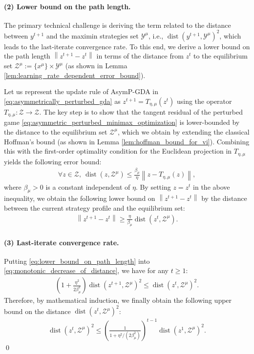 \documentclass{article}
\DeclareMathOperator{\dist}{dist}
\newcommand{\Y}{\mathcal{Y}}
\newcommand{\Z}{\mathcal{Z}}
\theoremstyle{plain}
\begin{document}
\paragraph{(2) Lower bound on the path length.}
The primary technical challenge is deriving the term related to the distance between $y^{t+1}$ and the maximin strategies set $\Y^{\mu}$, i.e., $\dist(y^{t+1}, \Y^{\mu})^2$, which leads to the last-iterate convergence rate.
To this end, we derive a lower bound on the path length $\left\|z^{t+1} - z^t\right\|$ in terms of the distance from $z^t$ to the equilibrium set $\Z^{\mu} := \{x^{\mu}\}\times \Y^{\mu}$ (as shown in Lemma \ref{lem:learning_rate_dependent_error_bound}).

Let us represent the update rule of AsymP-GDA in \eqref{eq:asymmetrically_perturbed_gda} as $z^{t+1} = T_{\eta, \mu}(z^t)$ using the operator $T_{\eta, \mu}: \Z \to \Z$.
The key step is to show that the tangent residual of the perturbed game \eqref{eq:asymmetric_perturbed_minimax_optimization} is lower-bounded by the distance to the equilibrium set $\Z^{\mu}$, which we obtain by extending the classical Hoffman's bound \citep{hoffman1952approximate} (as shown in Lemma \ref{lem:hoffman_bound_for_vi}).
Combining this with the first-order optimality condition for the Euclidean projection in $T_{\eta, \mu}$ yields the following error bound:
\begin{align*}
    \forall z\in \Z, ~\dist(z, \Z^{\mu}) \leq \frac{\beta_{\mu}}{\eta}\left\|z - T_{\eta, \mu}(z)\right\|,
\end{align*}
where $\beta_{\mu} > 0$ is a constant independent of $\eta$.
By setting $z = z^t$ in the above inequality, we obtain the following lower bound on $\left\|z^{t+1} - z^t\right\|$ by the distance between the current strategy profile and the equilibrium set:
\begin{align}
    \left\|z^{t+1} - z^t\right\| \geq \frac{\eta}{\beta_{\mu}}\dist(z^t, \Z^{\mu}).
    \label{eq:lower_bound_on_path_length}
\end{align}

\paragraph{(3) Last-iterate convergence rate.}
Putting \eqref{eq:lower_bound_on_path_length} into \eqref{eq:monotonic_decrease_of_distance}, we have for any $t\geq 1$:
\begin{align*}
    \left(1 + \frac{\eta^2}{2\beta_{\mu}^2}\right)\dist(z^{t+1}, \Z^{\mu})^2 \leq \dist(z^t, \Z^{\mu})^2.
\end{align*}
Therefore, by mathematical induction, we finally obtain the following upper bound on the distance $\dist(z^t, \Z^{\mu})^2$:
\begin{align*}
    \dist(z^t, \Z^{\mu})^2 \leq \left(\frac{1}{1 + \eta^2/(2\beta_{\mu}^2)}\right)^{t-1} \dist(z^1, \Z^{\mu})^2.
\end{align*}
\qed
\end{document}
